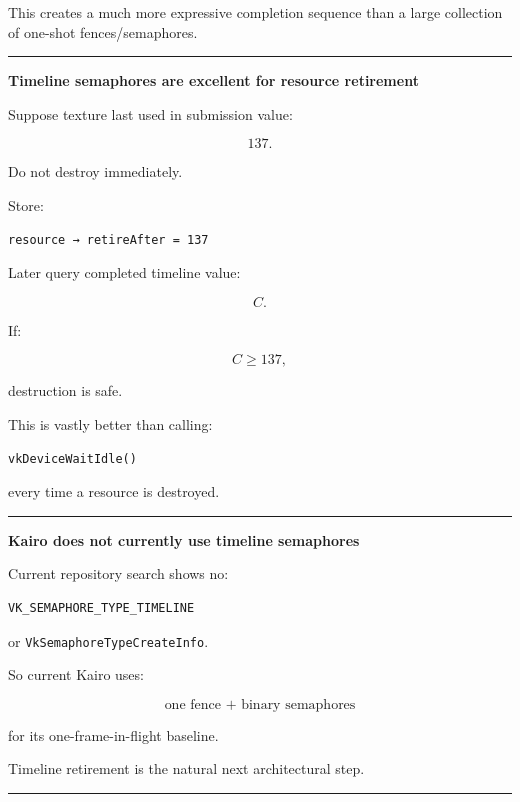 This creates a much more expressive completion sequence than a large collection of one-shot fences/semaphores.

\begin{center}\rule{0.5\linewidth}{0.5pt}\end{center}

\textbf{Timeline semaphores are excellent for resource retirement}

Suppose texture last used in submission value:

\[
137.
\]

Do not destroy immediately.

Store:

\begin{verbatim}
resource → retireAfter = 137
\end{verbatim}

Later query completed timeline value:

\[
C.
\]

If:

\[
C\ge137,
\]

destruction is safe.

This is vastly better than calling:

\begin{verbatim}
vkDeviceWaitIdle()
\end{verbatim}

every time a resource is destroyed.

\begin{center}\rule{0.5\linewidth}{0.5pt}\end{center}

\textbf{Kairo does not currently use timeline semaphores}

Current repository search shows no:

\begin{verbatim}
VK_SEMAPHORE_TYPE_TIMELINE
\end{verbatim}

or \texttt{VkSemaphoreTypeCreateInfo}.

So current Kairo uses:

\[
\boxed{
\text{one fence + binary semaphores}
}
\]

for its one-frame-in-flight baseline.

Timeline retirement is the natural next architectural step.

\begin{center}\rule{0.5\linewidth}{0.5pt}\end{center}

